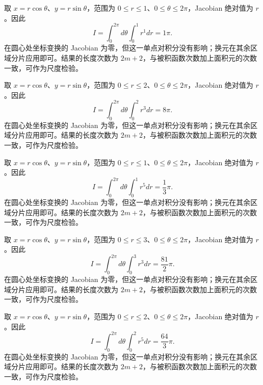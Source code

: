 \documentclass[UTF8,12pt,a4paper,fontset=fandol]{ctexart}
\begin{document}
\begin{solve}\label{ans:c36q14}
取 $x=r\cos\theta$、$y=r\sin\theta$，范围为 $0\le r\le 1$、$0\le\theta\le2\pi$，Jacobian 绝对值为 $r$。因此
\[
I=\int_0^{2\pi}d\theta\int_0^{1}r^{1}dr=1\pi.
\]
在圆心处坐标变换的 Jacobian 为零，但这一单点对积分没有影响；换元在其余区域分片应用即可。结果的长度次数为 $2m+2$，与被积函数次数加上面积元的次数一致，可作为尺度检验。
\end{solve}

\begin{solve}\label{ans:c36q15}
取 $x=r\cos\theta$、$y=r\sin\theta$，范围为 $0\le r\le 2$、$0\le\theta\le2\pi$，Jacobian 绝对值为 $r$。因此
\[
I=\int_0^{2\pi}d\theta\int_0^{2}r^{3}dr=8\pi.
\]
在圆心处坐标变换的 Jacobian 为零，但这一单点对积分没有影响；换元在其余区域分片应用即可。结果的长度次数为 $2m+2$，与被积函数次数加上面积元的次数一致，可作为尺度检验。
\end{solve}

\begin{solve}\label{ans:c36q16}
取 $x=r\cos\theta$、$y=r\sin\theta$，范围为 $0\le r\le 1$、$0\le\theta\le2\pi$，Jacobian 绝对值为 $r$。因此
\[
I=\int_0^{2\pi}d\theta\int_0^{1}r^{5}dr=\frac{1}{3}\pi.
\]
在圆心处坐标变换的 Jacobian 为零，但这一单点对积分没有影响；换元在其余区域分片应用即可。结果的长度次数为 $2m+2$，与被积函数次数加上面积元的次数一致，可作为尺度检验。
\end{solve}

\begin{solve}\label{ans:c36q17}
取 $x=r\cos\theta$、$y=r\sin\theta$，范围为 $0\le r\le 3$、$0\le\theta\le2\pi$，Jacobian 绝对值为 $r$。因此
\[
I=\int_0^{2\pi}d\theta\int_0^{3}r^{3}dr=\frac{81}{2}\pi.
\]
在圆心处坐标变换的 Jacobian 为零，但这一单点对积分没有影响；换元在其余区域分片应用即可。结果的长度次数为 $2m+2$，与被积函数次数加上面积元的次数一致，可作为尺度检验。
\end{solve}

\begin{solve}\label{ans:c36q18}
取 $x=r\cos\theta$、$y=r\sin\theta$，范围为 $0\le r\le 2$、$0\le\theta\le2\pi$，Jacobian 绝对值为 $r$。因此
\[
I=\int_0^{2\pi}d\theta\int_0^{2}r^{5}dr=\frac{64}{3}\pi.
\]
在圆心处坐标变换的 Jacobian 为零，但这一单点对积分没有影响；换元在其余区域分片应用即可。结果的长度次数为 $2m+2$，与被积函数次数加上面积元的次数一致，可作为尺度检验。
\end{solve}
\end{document}
